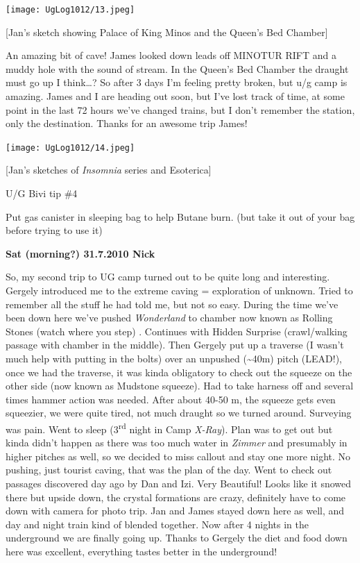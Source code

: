 \texttt{[image: UgLog1012/13.jpeg]}

{[}Jan's sketch showing Palace of King Minos and the Queen's Bed
Chamber{]}

An amazing bit of cave! James looked down leads off MINOTUR RIFT and a
muddy hole with the sound of stream. In the Queen's Bed Chamber the
draught must go up I think\ldots{}? So after 3 days I'm feeling pretty
broken, but u/g camp is amazing. James and I are heading out soon, but
I've lost track of time, at some point in the last 72 hours we've
changed trains, but I don't remember the station, only the destination.
Thanks for an awesome trip James!

\texttt{[image: UgLog1012/14.jpeg]}

{[}Jan's sketches of \emph{Insomnia} series and Esoterica{]}

U/G Bivi tip \#4

Put gas canister in sleeping bag to help Butane burn. (but take it out
of your bag before trying to use it)

\textbf{Sat (morning?) 31.7.2010 Nick}

So, my second trip to UG camp turned out to be quite long and
interesting. Gergely introduced me to the extreme caving = exploration
of unknown. Tried to remember all the stuff he had told me, but not so
easy. During the time we've been down here we've pushed
\emph{Wonderland} to chamber now known as Rolling Stones (watch where
you step) . Continues with Hidden Surprise (crawl/walking passage with
chamber in the middle). Then Gergely put up a traverse (I wasn't much
help with putting in the bolts) over an unpushed (\textasciitilde{}40m)
pitch (LEAD!), once we had the traverse, it was kinda obligatory to
check out the squeeze on the other side (now known as Mudstone squeeze).
Had to take harness off and several times hammer action was needed.
After about 40-50 m, the squeeze gets even squeezier, we were quite
tired, not much draught so we turned around. Surveying was pain. Went to
sleep (3\textsuperscript{rd} night in Camp \emph{X-Ray}). Plan was to
get out but kinda didn't happen as there was too much water in
\emph{Zimmer} and presumably in higher pitches as well, so we decided to
miss callout and stay one more night. No pushing, just tourist caving,
that was the plan of the day. Went to check out passages discovered day
ago by Dan and Izi. Very Beautiful! Looks like it snowed there but
upside down, the crystal formations are crazy, definitely have to come
down with camera for photo trip. Jan and James stayed down here as well,
and day and night train kind of blended together. Now after 4 nights in
the underground we are finally going up. Thanks to Gergely the diet and
food down here was excellent, everything tastes better in the
underground!

